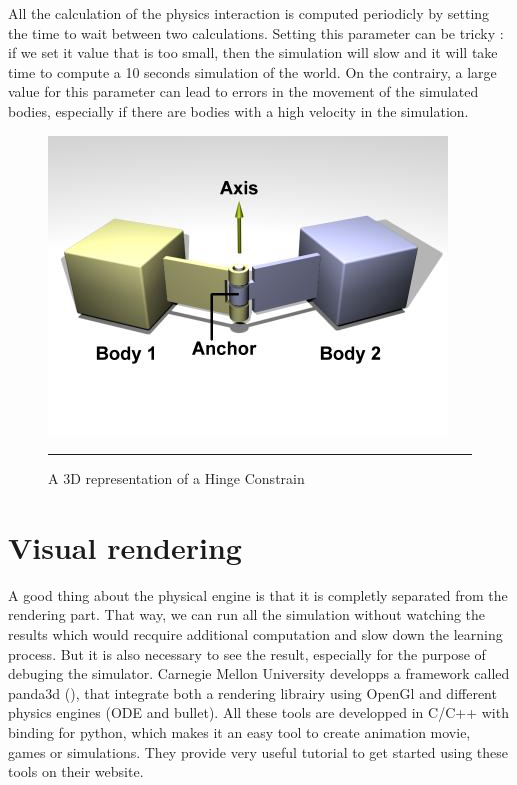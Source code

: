     All the calculation of the physics interaction is computed periodicly by setting the time to wait between two calculations. Setting this parameter can be tricky : if we set it value that is too small, then the simulation will slow and it will take time to compute a 10 seconds simulation of the world. On the contrairy, a large value for this parameter can lead to errors in the movement of the simulated bodies, especially if there are bodies with a high velocity in the simulation.

\begin{figure}[htbp]
    \centering
    \includegraphics[scale=0.5]{Figures/hinge.jpg}
    \rule{35em}{0.5pt}
    \caption[A Hinge Constraint]{A 3D representation of a Hinge Constrain}
    \label{fig:Hinge}
\end{figure}

\section{Visual rendering}
A good thing about the physical engine is that it is completly separated from the rendering part. That way, we can run all the simulation without watching the results which would recquire additional computation and slow down the learning process. But it is also necessary to see the result, especially for the purpose of debuging the simulator. Carnegie Mellon University developps a framework called panda3d (\cite{panda3d}), that integrate both a rendering librairy using OpenGl and different physics engines (ODE and bullet). All these tools are developped in C/C++ with binding for python, which makes it an easy tool to create animation movie, games or simulations. They provide very useful tutorial to get started using these tools on their website.

